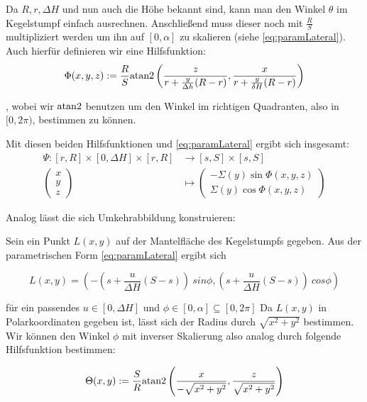 Da $R, r, \Delta H$  und nun auch die Höhe bekannt sind, kann man den Winkel $\theta$ im Kegelstumpf einfach ausrechnen. Anschließend muss dieser noch mit  $\frac{R}{S}$ multipliziert werden um ihn auf $[0, \alpha]$ zu skalieren (siehe \ref{eq:paramLateral}).  Auch hierfür definieren wir eine Hilfsfunktion:
\begin{equation*}
\Phi(x,y,z) := \frac{R}{S} \text{atan2}\left(\frac{z}{r + \frac{y}{\Delta h} (R - r)}, \frac{x}{r + \frac{y}{\delta H} (R - r)}\right)
\end{equation*}

, wobei wir $\text{atan2}$ benutzen um den Winkel im richtigen Quadranten, also in $[0, 2\pi)$, bestimmen zu können. 

Mit diesen beiden Hilfsfunktionen und \ref{eq:paramLateral} ergibt sich insgesamt:
\begin{equation}
\begin{aligned}
\Psi \colon [r,R] \times [0, \Delta H] \times [r,R] &\to [s,S] \times [s,S]\\
\begin{pmatrix}
x \\ y \\ z
\end{pmatrix}  &\mapsto
\begin{pmatrix}
-\Sigma(y)\sin \Phi(x,y,z)\\
 \Sigma(y)\cos\Phi(x,y,z)
\end{pmatrix}
\end{aligned}
\end{equation}

Analog lässt die sich Umkehrabbildung konstruieren:

Sein ein Punkt $L(x,y)$ auf der Mantelfläche des Kegelstumpfs gegeben. Aus der parametrischen Form \ref{eq:paramLateral} ergibt sich

\[
L(x,y) = (-(s + \frac{u}{\Delta H}(S-s)) ~sin \phi, (s + \frac{u}{\Delta H} (S-s)) ~cos \phi)
\]

für ein passendes $u\in [0, \Delta H]$ und $\phi \in [0, \alpha] \subseteq  [0, 2\pi]$
Da $L(x,y)$ in Polarkoordinaten gegeben ist, lässt sich der Radius durch $\sqrt{x^2+y^2}$ bestimmen. Wir können den Winkel $\phi$ mit inverser Skalierung also analog durch folgende Hilfsfunktion bestimmen:

\begin{equation*}
\Theta(x,y) := \frac{S}{R} \text{atan2}\left(\frac{x}{-\sqrt{x^2+y^2}}, \frac{z}{\sqrt{x^2+y^2}}\right)
\end{equation*}

